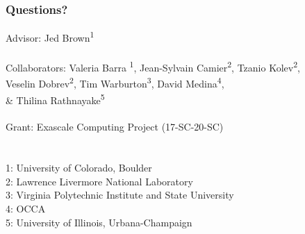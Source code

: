\documentclass{beamer}
\begin{document}
\begin{frame}
\begin{center}
\frametitle{Questions?}

{\flushleft

Advisor: \hspace{8mm} Jed Brown\textsuperscript{1}\\

~\\

Collaborators: Valeria Barra \textsuperscript{1}, Jean-Sylvain Camier\textsuperscript{2}, Tzanio Kolev\textsuperscript{2},\\
\hspace{23mm} Veselin Dobrev\textsuperscript{2}, Tim Warburton\textsuperscript{3}, David Medina\textsuperscript{4},\\
\hspace{23mm} \& Thilina Rathnayake\textsuperscript{5}\\

~\\

Grant: \hspace{11mm} Exascale Computing Project (17-SC-20-SC)\\

~\\

~\\

\small{1: University of Colorado, Boulder\\
2: Lawrence Livermore National Laboratory\\
3: Virginia Polytechnic Institute and State University\\
4: OCCA\\
5: University of Illinois, Urbana-Champaign\\}}

\end{center}
\end{frame}


\begin{frame}[noframenumbering]
\titlepage %
\end{frame}


\end{document}
